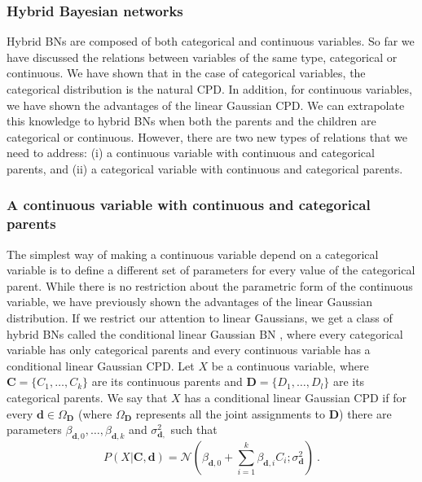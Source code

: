 \subsubsection{Hybrid Bayesian networks}
Hybrid BNs are composed of both categorical and continuous variables. So far we have discussed the relations between variables of the same type, categorical or continuous. We have shown that in the case of categorical variables, the categorical distribution is the natural CPD. In addition, for continuous variables, we have shown the advantages of the linear Gaussian CPD. We can extrapolate this knowledge to hybrid BNs when both the parents and the children are categorical or continuous. However, there are two new types of relations that we need to address: (i) a continuous variable with continuous and categorical parents, and (ii) a categorical variable with continuous and categorical parents.

\subsubsection*{A continuous variable with continuous and categorical parents}
The simplest way of making a continuous variable depend on a categorical variable is to define a different set of parameters for every value of the categorical parent. While there is no restriction about the parametric form of the continuous variable, we have previously shown the advantages of the linear Gaussian distribution. If we restrict our attention to linear Gaussians, we get a class of hybrid BNs called the conditional linear Gaussian BN \citep{lauritzen1989}, where every categorical variable has only categorical parents and every continuous variable has a conditional linear Gaussian CPD. Let $X$ be a continuous variable, where $\mathbf{C} = \{C_{1},\dots, C_{k}\}$ are its continuous parents and $\mathbf{D} = \{D_{1},\dots, D_{l}\}$ are its categorical parents. We say that $X$ has a conditional linear Gaussian CPD if for every $\mathbf{d} \in \Omega_{\mathbf{D}}$ (where $\Omega_{\mathbf{D}}$ represents all the joint assignments to $\mathbf{D}$) there are parameters $\beta_{\mathbf{d},0},\dots,\beta_{\mathbf{d},k}$ and $\sigma^{2}_{\mathbf{d},}$ such that
\begin{equation*}
P(X|\mathbf{C},\mathbf{d}) = \mathcal{N}(\beta_{\mathbf{d},0} + \sum_{i=1}^{k}\beta_{\mathbf{d},i}C_{i}; \sigma^{2}_{\mathbf{d}}) \ .
\end{equation*}

